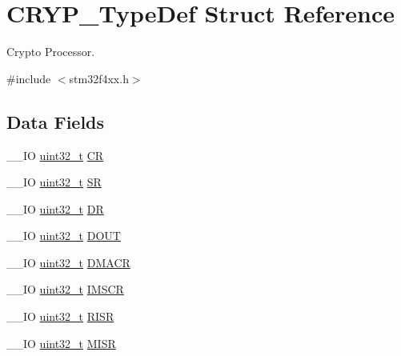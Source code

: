 \hypertarget{struct_c_r_y_p___type_def}{\section{C\-R\-Y\-P\-\_\-\-Type\-Def Struct Reference}
\label{struct_c_r_y_p___type_def}
}


Crypto Processor.  




{\ttfamily \#include $<$stm32f4xx.\-h$>$}

\subsection*{Data Fields}
\begin{DoxyCompactItemize}
\item 
\-\_\-\-\_\-\-I\-O \hyperlink{stdint_8h_a435d1572bf3f880d55459d9805097f62}{uint32\-\_\-t} \hyperlink{struct_c_r_y_p___type_def_a65da2a40a06c5c391cbe346dbaa5380c}{C\-R}
\item 
\-\_\-\-\_\-\-I\-O \hyperlink{stdint_8h_a435d1572bf3f880d55459d9805097f62}{uint32\-\_\-t} \hyperlink{struct_c_r_y_p___type_def_a1d5cabaf9aea97e1b6f08352bc249094}{S\-R}
\item 
\-\_\-\-\_\-\-I\-O \hyperlink{stdint_8h_a435d1572bf3f880d55459d9805097f62}{uint32\-\_\-t} \hyperlink{struct_c_r_y_p___type_def_ab478a4717a3fa209b9c060ecaf70c9a1}{D\-R}
\item 
\-\_\-\-\_\-\-I\-O \hyperlink{stdint_8h_a435d1572bf3f880d55459d9805097f62}{uint32\-\_\-t} \hyperlink{struct_c_r_y_p___type_def_a0b3e1f1551d11a01f7b2356e91281e7d}{D\-O\-U\-T}
\item 
\-\_\-\-\_\-\-I\-O \hyperlink{stdint_8h_a435d1572bf3f880d55459d9805097f62}{uint32\-\_\-t} \hyperlink{struct_c_r_y_p___type_def_ad525241894427fc83a16e3370bb5b1d8}{D\-M\-A\-C\-R}
\item 
\-\_\-\-\_\-\-I\-O \hyperlink{stdint_8h_a435d1572bf3f880d55459d9805097f62}{uint32\-\_\-t} \hyperlink{struct_c_r_y_p___type_def_a3ee13f960f6631c574b1018c97f95925}{I\-M\-S\-C\-R}
\item 
\-\_\-\-\_\-\-I\-O \hyperlink{stdint_8h_a435d1572bf3f880d55459d9805097f62}{uint32\-\_\-t} \hyperlink{struct_c_r_y_p___type_def_a04be1b2f14a37aed1deff4d57e6261dd}{R\-I\-S\-R}
\item 
\-\_\-\-\_\-\-I\-O \hyperlink{stdint_8h_a435d1572bf3f880d55459d9805097f62}{uint32\-\_\-t} \hyperlink{struct_c_r_y_p___type_def_aa807ff93c7ce98e9d13cbc52d245770f}{M\-I\-S\-R}
\item 

\end{DoxyCompactItemize}

